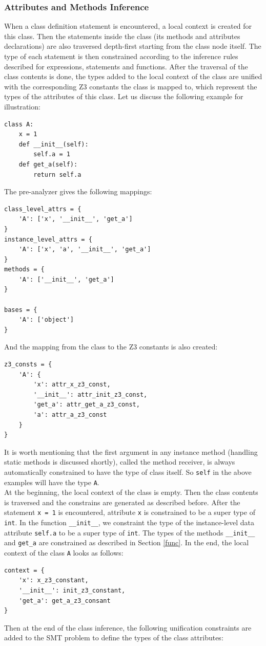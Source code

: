 \subsubsection{Attributes and Methods Inference}
When a class definition statement is encountered, a local context is created for this class. Then the statements inside the class (its methods and attributes declarations) are also traversed depth-first starting from the class node itself. The type of each statement is then constrained according to the inference rules described for expressions, statements and functions. After the traversal of the class contents is done, the types added to the local context of the class are unified with the corresponding Z3 constants the class is mapped to, which represent the types of the attributes of this class. Let us discuss the following example for illustration:
\begin{lstlisting}
class A:
	x = 1
	def __init__(self):
		self.a = 1
	def get_a(self):
		return self.a
\end{lstlisting}
The pre-analyzer gives the following mappings:
\begin{lstlisting}
class_level_attrs = {
	'A': ['x', '__init__', 'get_a']
}
instance_level_attrs = {
	'A': ['x', 'a', '__init__', 'get_a']
}
methods = {
	'A': ['__init__', 'get_a']
}

bases = {
	'A': ['object']
}
\end{lstlisting}
And the mapping from the class to the Z3 constants is also created:

\begin{lstlisting}
z3_consts = {
	'A': {
		'x': attr_x_z3_const,
		'__init__': attr_init_z3_const,
		'get_a': attr_get_a_z3_const,
		'a': attr_a_z3_const
	}
}
\end{lstlisting}
It is worth mentioning that the first argument in any instance method (handling static methods is discussed shortly), called the method receiver, is always automatically constrained to have the type of class itself. So \lstinline|self| in the above examples will have the type \lstinline|A|. \\

At the beginning, the local context of the class is empty. Then the class contents is traversed and the constrains are generated as described before. After the statement \lstinline|x = 1| is encountered, attribute \lstinline|x| is constrained to be a super type of \lstinline|int|. In the function \lstinline|__init__|, we constraint the type of the instance-level data attribute \lstinline|self.a| to be a super type of \lstinline|int|. The types of the methods \lstinline|__init__| and \lstinline|get_a| are constrained as described in Section \ref{func}. In the end, the local context of the class \lstinline|A| looks as follows:
\begin{lstlisting}
context = {
	'x': x_z3_constant,
	'__init__': init_z3_constant,
	'get_a': get_a_z3_consant
}
\end{lstlisting}
Then at the end of the class inference, the following unification constraints are added to the SMT problem to define the types of the class attributes:

